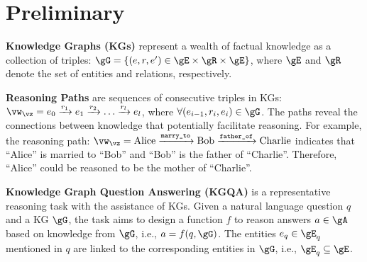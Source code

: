 
\section{Preliminary}\label{sec:preliminary}

\noindent\textbf{Knowledge Graphs (KGs)} represent a wealth of factual knowledge as a collection of triples: $\gG=\{(e,r,e')\in \gE\times\gR\times\gE\}$, where $\gE$ and $\gR$ denote the set of entities and relations, respectively.

\noindent\textbf{Reasoning Paths} are sequences of consecutive triples in KGs: $\vw_\vz=e_0\xrightarrow{r_1}e_1\xrightarrow{r_2}\ldots\xrightarrow{r_l}e_{l}$, where $\forall (e_{i-1}, r_i, e_i)\in \gG$.
%
The paths reveal the connections between knowledge that potentially facilitate reasoning. For example, the reasoning path: $\vw_\vz=\text{Alice}\xrightarrow{\texttt{marry\_to}}\text{Bob}\xrightarrow{\texttt{father\_of}}\text{Charlie}$ indicates that ``Alice'' is married to ``Bob'' and ``Bob'' is the father of ``Charlie''. Therefore, ``Alice'' could be reasoned to be the mother of ``Charlie''.

\noindent\textbf{Knowledge Graph Question Answering (KGQA)} is a representative reasoning task with the assistance of KGs. Given a natural language question $q$ and a KG $\gG$, the task aims to design a function $f$ to reason answers $a\in\gA$ based on knowledge from $\gG$, i.e., $a=f(q,\gG)$. 
The entities $e_q\in\gE_q$ mentioned in $q$ are linked to the corresponding entities in $\gG$, i.e., $\gE_q\subseteq\gE$.

